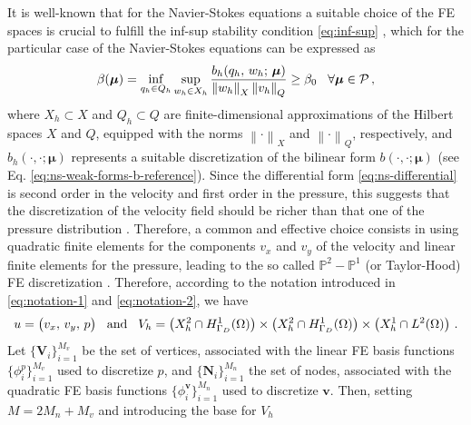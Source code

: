 \documentclass[12pt, a4paper, twoside, openright, notitlepage]{report}
\numberwithin{equation}{chapter}
\theoremstyle{theorem}
\theoremstyle{definition}
\theoremstyle{remark}
\theoremstyle{proposition}
\numberwithin{figure}{chapter}
\newcommand{\norm}[1]{\left\lVert#1\right\rVert}
\newcommand{\bg}[1]{\boldsymbol{#1}}
\begin{document}
		It is well-known that for the Navier-Stokes equations a suitable choice of the FE spaces is crucial to fulfill the inf-sup stability condition \eqref{eq:inf-sup} \cite{Ran99}, which for the particular case of the Navier-Stokes equations can be expressed as
		\begin{equation}
			\label{eq:inf-sup-ns}
			\beta(\bg{\mu}) = \inf_{q_h \in Q_h} \sup_{w_h \in X_h} \dfrac{b_h(q_h, \, w_h; \, \bg{\mu})}{\norm{w_h}_X \norm{v_h}_Q} \geq \beta_0 \hspace*{0.3cm} \forall \bg{\mu} \in \mathcal{P} \, ,
		\end{equation}
		where $X_h \subset X$ and $Q_h \subset Q$ are finite-dimensional approximations of the Hilbert spaces $X$ and $Q$, equipped with the norms $\norm{\cdot}_X$ and $\norm{\cdot}_Q$, respectively, and $b_h(\cdot, \cdot; \bg{\mu})$ represents a suitable discretization of the bilinear form $b(\cdot, \cdot; \bg{\mu})$ (see Eq. \eqref{eq:ns-weak-forms-b-reference}). Since the differential form \eqref{eq:ns-differential} is second order in the velocity and first order in the pressure, this suggests that the discretization of the velocity field should be richer than that one of the pressure distribution \cite{Qua10}. Therefore, a common and effective choice consists in using quadratic finite elements for the components $v_x$ and $v_y$ of the velocity and linear finite elements for the pressure, leading to the so called $\mathbb{P}^2 - \mathbb{P}^1$ (or Taylor-Hood) FE discretization \cite{Per02}. Therefore, according to the notation introduced in \eqref{eq:notation-1} and \eqref{eq:notation-2}, we have
		\begin{equation*}
			\begin{aligned}
				u = \big( v_x, \, v_y, \, p \big) \hspace*{0.3cm} \text{and} \hspace*{0.3cm} V_h = \left( X_h^2 \cap H^1_{\Gamma_D}(\Omega) \right) \times \left( X_h^2 \cap H^1_{\Gamma_D}(\Omega) \right) \times \left( X_h^1 \cap L^2(\Omega) \right) \, .
			\end{aligned}
		\end{equation*}
		Let $\big\lbrace \bg{V}_i \big\rbrace_{i = 1}^{M_v}$ be the set of vertices, associated with the linear FE basis functions $\big\lbrace \phi_i^p \big\rbrace_{i = 1}^{M_v}$ used to discretize $p$, and $\big\lbrace \bg{N}_i \big\rbrace_{i = 1}^{M_n}$ the set of nodes, associated with the quadratic FE basis functions $\big\lbrace \phi_i^{\bg{v}} \big\rbrace_{i = 1}^{M_n}$ used to discretize $\bg{v}$. Then, setting $M = 2 M_n +M_v$ and introducing the base for $V_h$
\end{document}

